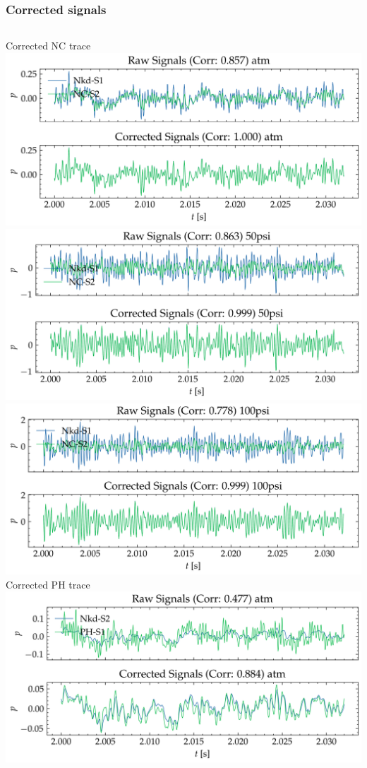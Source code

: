 \documentclass[aspectratio=169,10pt]{beamer}
\begin{document}
\begin{frame}
    \frametitle{Corrected signals}
    \begin{columns}[c]
        \centering
            Corrected NC trace
            \includegraphics[width=\linewidth]{NC-NKD/y_atm.png}
            \includegraphics[width=\linewidth]{NC-NKD/y_50psi.png}
            \includegraphics[width=\linewidth]{NC-NKD/y_100psi.png}
        \centering
            Corrected PH trace
            \includegraphics[width=\linewidth]{PH-NKD/y_atm.png}

\end{columns}
\end{frame}
\end{document}

